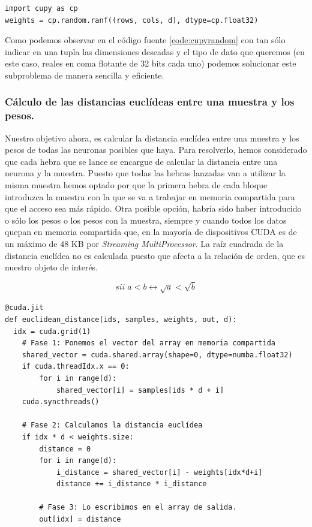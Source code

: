 \begin{code}
\begin{verbatim}
import cupy as cp
weights = cp.random.ranf((rows, cols, d), dtype=cp.float32)
\end{verbatim}
\label{code:cupyrandom}
\end{code}


Como podemos observar en el código fuente \ref{code:cupyrandom} con tan sólo indicar en una tupla las dimensiones deseadas y el tipo de dato que queremos (en este caso, reales en coma flotante de 32 bits cada uno) podemos solucionar este subproblema de manera sencilla y eficiente.\\

\subsubsection{Cálculo de las distancias euclídeas entre una muestra y los pesos.}
Nuestro objetivo ahora, es calcular la distancia euclídea entre una muestra y los pesos de todas las neuronas posibles que haya. Para resolverlo, hemos considerado que cada hebra que se lance se encargue de calcular la distancia entre una neurona y la muestra. Puesto que todas las hebras lanzadas van a utilizar la misma muestra hemos optado por que la primera hebra de cada bloque introduzca la muestra con la que se va a trabajar en memoria compartida para que el acceso sea más rápido. Otra posible opción, habría sido haber introducido o sólo los pesos o los pesos con la muestra, siempre y cuando todos los datos quepan en memoria compartida que, en la mayoría de dispositivos CUDA es de un máximo de 48 KB por \textit{Streaming MultiProcessor}. La raíz cuadrada de la distancia euclídea no es calculada puesto que afecta a la relación de orden, que es nuestro objeto de interés.

$$
sii \; a < b \leftrightarrow \sqrt{a} < \sqrt{b}
$$

\begin{code}
\begin{verbatim}
@cuda.jit
def euclidean_distance(ids, samples, weights, out, d):
  idx = cuda.grid(1)
    # Fase 1: Ponemos el vector del array en memoria compartida
    shared_vector = cuda.shared.array(shape=0, dtype=numba.float32)
    if cuda.threadIdx.x == 0:
        for i in range(d):
            shared_vector[i] = samples[ids * d + i]
    cuda.syncthreads()

    # Fase 2: Calculamos la distancia euclídea
    if idx * d < weights.size:
        distance = 0
        for i in range(d):
            i_distance = shared_vector[i] - weights[idx*d+i]
            distance += i_distance * i_distance
            
        # Fase 3: Lo escribimos en el array de salida.
        out[idx] = distance
\end{verbatim}
\label{code:euclideaonline}
\end{code}


